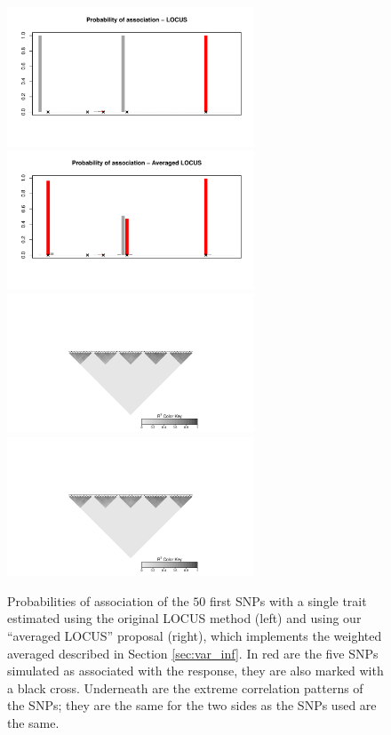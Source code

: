 \documentclass[a4paper, 11pt]{report}
\numberwithin{equation}{chapter}
\begin{document}
\begin{figure}[h]
\centering
\includegraphics[width=2.9in, bb= 0 0 8in 4in]{images/proba_single.pdf}
\includegraphics[width=2.9in, bb= 0 0 8in 4in]{images/proba_averaged.pdf}
\includegraphics[width=2.9in, bb= 1.32in 0 6.4in 2in]{images/LD_plot.pdf}
\includegraphics[width=2.9in, bb= 1.32in 0 6.4in 2in]{images/LD_plot.pdf}
\caption{\label{fig:simple_locus}Probabilities of association of the $50$ first SNPs with a single trait estimated using the original LOCUS method (left) and using our ``averaged LOCUS'' proposal (right), which implements the weighted averaged described in Section \ref{sec:var_inf}. In red are the five SNPs simulated as associated with the response, they are also marked with a black cross. Underneath are the extreme correlation patterns of the SNPs; they are the same for the two sides as the SNPs used are the same.}
\end{figure}
\end{document}
